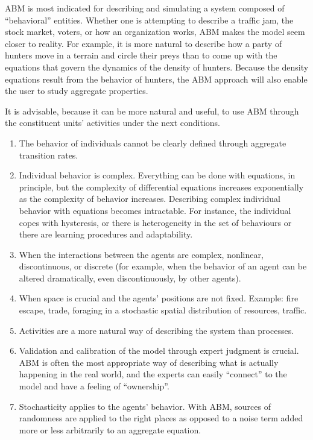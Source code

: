 \documentclass[11pt,oneside,a4paper,openright]{report}
\begin{document}
ABM is most indicated for describing and simulating a system composed of “behavioral” entities. Whether one is attempting to describe a traffic jam, the stock market, voters, or how an organization works, ABM makes the model seem closer to reality. For example, it is more natural to describe how a party of hunters move in a terrain and circle their preys than to come up with the equations that govern the dynamics of the density of hunters. Because the density equations result from the behavior of hunters, the ABM approach will also enable the user to study aggregate properties.  


It is advisable, because it can be more natural and useful, to use ABM through the constituent units' activities under the next conditions.
\begin{enumerate}[i-] 
\item The behavior of individuals cannot be clearly defined through aggregate transition rates.
\item Individual behavior is complex. Everything can be done with equations, in principle, but the complexity of differential equations increases exponentially as the complexity of behavior increases. Describing complex individual behavior with equations becomes intractable. For instance, the individual copes with hysteresis, or there is heterogeneity in the set of behaviours or there are learning procedures and adaptability.
\item When the interactions between the agents are complex, nonlinear, discontinuous, or discrete (for example, when the behavior of an agent can be altered dramatically, even discontinuously, by other agents).
\item When space is crucial and the agents' positions are not fixed. Example: fire escape, trade, foraging in a stochastic spatial distribution of resources, traffic.
\item Activities are a more natural way of describing the system than processes.
\item Validation and calibration of the model through expert judgment is crucial. ABM is often the most appropriate way of describing what is actually happening in the real world, and the experts can easily “connect” to the model and have a feeling of “ownership”. 
\item Stochasticity applies to the agents' behavior. With ABM, sources of randomness are applied to the right places as opposed to a noise term added more or less arbitrarily to an aggregate equation. 
\end{enumerate}
\end{document}
